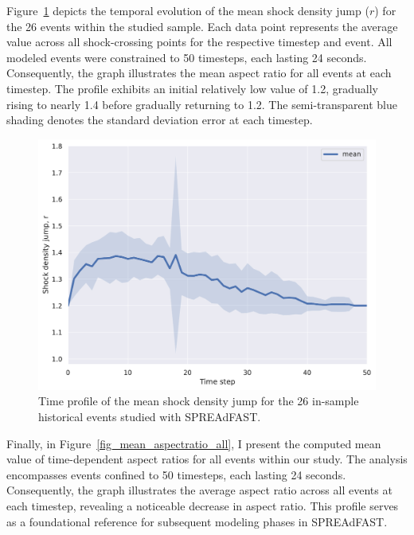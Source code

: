 
Figure~\ref{fig_mean_densjump_all} depicts the temporal evolution of the mean shock density jump ($r$) for the 26 events within the studied sample. Each data point represents the average value across all shock-crossing points for the respective timestep and event. All modeled events were constrained to 50 timesteps, each lasting 24 seconds. Consequently, the graph illustrates the mean aspect ratio for all events at each timestep. The profile exhibits an initial relatively low value of 1.2, gradually rising to nearly 1.4 before gradually returning to 1.2. The semi-transparent blue shading denotes the standard deviation error at each timestep.

\begin{figure}[!htp] %
	\centerline{\includegraphics[width=0.8\columnwidth]{chapter2/figs/mean_densityjump_stat.pdf}}
	\caption{Time profile of the mean shock density jump for the 26 in-sample historical events studied with SPREAdFAST.}
	\label{fig_mean_densjump_all}
\end{figure}

Finally, in Figure~\ref{fig_mean_aspectratio_all}, I present the computed mean value of time-dependent aspect ratios for all events within our study. The analysis encompasses events confined to 50 timesteps, each lasting 24 seconds. Consequently, the graph illustrates the average aspect ratio across all events at each timestep, revealing a noticeable decrease in aspect ratio. This profile serves as a foundational reference for subsequent modeling phases in SPREAdFAST.

